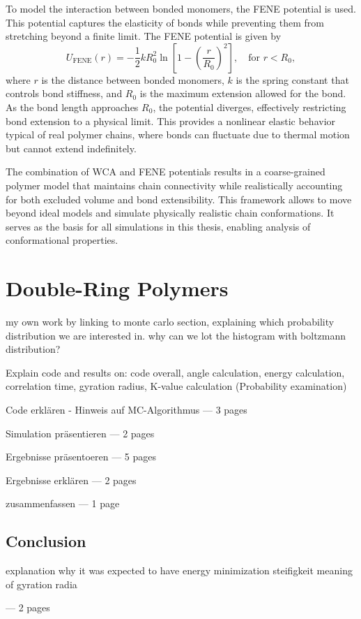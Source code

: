 \documentclass{article}      %
\begin{document}
To model the interaction between bonded monomers, the FENE potential is used. This potential captures the elasticity of bonds while preventing them from stretching beyond a finite limit. The FENE potential is given by
\begin{equation}
U_{\text{FENE}}(r) = -\frac{1}{2} k R_0^2 \ln \left[ 1 - \left( \frac{r}{R_0} \right)^2 \right], \quad \text{for } r < R_0,
\end{equation}
where \( r \) is the distance between bonded monomers, \( k \) is the spring constant that controls bond stiffness, and \( R_0 \) is the maximum extension allowed for the bond. As the bond length approaches \( R_0 \), the potential diverges, effectively restricting bond extension to a physical limit. This provides a nonlinear elastic behavior typical of real polymer chains, where bonds can fluctuate due to thermal motion but cannot extend indefinitely.

The combination of WCA and FENE potentials results in a coarse-grained polymer model that maintains chain connectivity while realistically accounting for both excluded volume and bond extensibility. This framework allows to move beyond ideal models and simulate physically realistic chain conformations. It serves as the basis for all simulations in this thesis, enabling analysis of conformational properties.

\newpage

\section{Double-Ring Polymers}
my own work
by linking to monte carlo section, explaining which probability distribution we are interested in.
why can we lot the histogram with boltzmann distribution?

Explain code and results on: code overall, angle calculation, energy calculation, correlation time, gyration radius, K-value calculation (Probability examination)

Code erklären - Hinweis auf MC-Algorithmus  --- 3 pages

Simulation präsentieren --- 2 pages

Ergebnisse präsentoeren --- 5 pages

Ergebnisse erklären --- 2 pages

zusammenfassen --- 1 page

\subsection{Conclusion}
explanation why it was expected to have energy minimization
steifigkeit
meaning of gyration radia

--- 2 pages


\pagebreak



\end{document}
